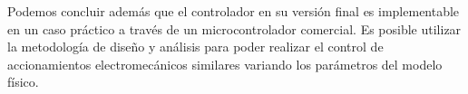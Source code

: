 \documentclass[a4paper, 10pt, onecolumn,journal]{ieeeconf}
\begin{document}
Podemos concluir además que el controlador en su versión final es implementable 
en un caso práctico a través de un microcontrolador comercial. Es posible utilizar
la metodología de diseño y análisis para poder realizar el control de accionamientos electromecánicos
similares variando los parámetros del modelo físico.




%
\nocite{*}
\printbibliography
\end{document}
